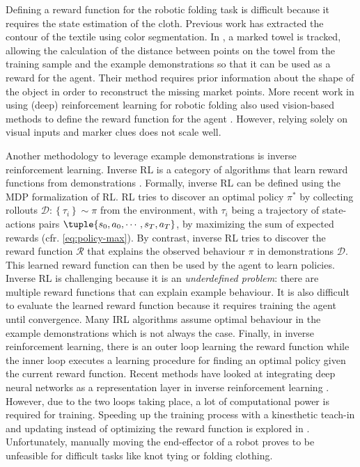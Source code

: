 \documentclass[\home/main.tex]{subfiles}
\begin{document}
Defining a reward function for the robotic folding task is difficult because it requires the state estimation of the cloth. Previous work \autocite{Doumanoglou2016,Miller2012} has extracted the contour of the textile using color segmentation. In \autocite{Balaguer2011}, a marked towel is tracked, allowing the calculation of the distance between points on the towel from the training sample and the example demonstrations so that it can be used as a reward for the agent. Their method requires prior information about the shape of the object in order to reconstruct the missing market points. More recent work in using (deep) reinforcement learning for robotic folding also used vision-based methods to define the reward function for the agent \autocite{Tsurumine2019, Matas2018}. However, relying solely on visual inputs and marker clues does not scale well. 

Another methodology to leverage example demonstrations is inverse reinforcement learning. Inverse RL is a category of algorithms that learn reward functions from demonstrations \autocite{Ng2000}. Formally, inverse RL can be defined using the \gls{MDP} formalization of RL. RL tries to discover an optimal policy $\pi^*$ by collecting rollouts $\mathcal{D}:\left\{\tau_{i}\right\} \sim \pi$ from the environment, with $\tau_{i}$ being a trajectory of state-actions pairs $\tuple{s_0, a_0, \cdots, s_T, a_T}$, by maximizing the sum of expected rewards (cfr. \cref{eq:policy-max}). By contrast, inverse RL tries to discover the reward function $\mathcal{R}$ that explains the observed behaviour $\pi$ in demonstrations $\mathcal{D}$. This learned reward function can then be used by the agent to learn policies. Inverse RL is challenging because it is an \emph{underdefined problem}: there are multiple reward functions that can explain example behaviour. It is also difficult to evaluate the learned reward function because it requires training the agent until convergence. Many IRL algorithms assume optimal behaviour in the example demonstrations which is not always the case. Finally, in inverse reinforcement learning, there is an outer loop learning the reward function while the inner loop executes a learning procedure for finding an optimal policy given the current reward function. Recent methods have looked at integrating deep neural networks as a representation layer in inverse reinforcement learning \autocite{Finn2016,Ho2016,Fu2018}. However, due to the two loops taking place, a lot of computational power is required for training. Speeding up the training process with a kinesthetic teach-in and updating instead of optimizing the reward function is explored in \autocite{Finn2016}. Unfortunately, manually moving the end-effector of a robot proves to be unfeasible for difficult tasks like knot tying or folding clothing.
\end{document}
